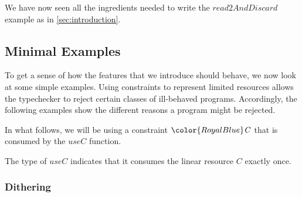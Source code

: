 \documentclass[acmsmall,usenames,dvipsnames,natbib=false,acmthm=false,screen]{acmart}
\newcommand{\Conid}[1]{\mathit{#1}}
\newcommand{\Varid}[1]{\mathit{#1}}
\def\resethooks{%
  \global\let\SaveRestoreHook\empty
  \global\let\ColumnHook\empty}
\let\hspre\empty
\let\hspost\empty
\newcommand{\jp}[2][1=]{}
\newcommand{\constraintcolour}{\color{RoyalBlue}}
\newcommand{\constraintfont}[1]{{\constraintcolour#1}}
\newcommand{\constraintop}[1]{\mathop{\constraintfont{#1}}}
\newcommand{\lollycirc}{\raisebox{-0.255ex}{\scalebox{1.4}{$\circ$}}}
\newcommand{\Lolly}{\constraintop{=\kern-1.1ex \lollycirc}}
\newcommand{\packbox}{\raisebox{-0.08ex}{\scalebox{0.88}{$\square$}}}
\theoremstyle{acmplain}
\theoremstyle{acmdefinition}
\begin{document}
We have now seen all the ingredients needed to write
the \ensuremath{\Varid{read2AndDiscard}} example as in \cref{sec:introduction}.

\subsection{Minimal Examples}
\label{sec:examples}

To get a sense of how the features that we introduce should behave, we now
look at some simple examples.\jp{This seems either way too late or redundant. How can anyone understand the previous section without already understanding this? I suggest either to 1. move this into the Linear Haskell section (using regular arguments). or 2. delete.} Using constraints to represent
limited resources allows the typechecker to reject certain classes
of ill-behaved programs. Accordingly, the following examples show the
different reasons a program might be rejected.

In what follows, we will be using a constraint \ensuremath{\constraintfont{\Conid{C}}} that is consumed by the \ensuremath{\Varid{useC}}
function.
\begin{hscode}\SaveRestoreHook
\column{B}{@{}>{\hspre}l<{\hspost}@{}}%
\column{E}{@{}>{\hspre}l<{\hspost}@{}}%
\>[B]{}\Varid{useC}\mathbin{::}\constraintfont{\Conid{C}}\Lolly \Conid{Int}{}\<[E]%
\ColumnHook
\end{hscode}\resethooks
The type of \ensuremath{\Varid{useC}} indicates that it consumes the linear resource \ensuremath{\Conid{C}} exactly once.

\subsubsection{Dithering}
\end{document}

